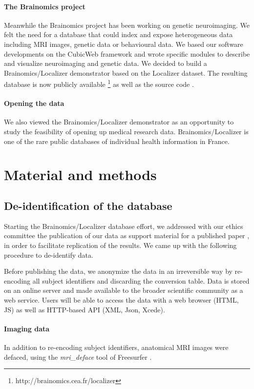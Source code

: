 \documentclass[review]{elsarticle}
\begin{document}
\paragraph{The Brainomics project} Meanwhile the Brainomics project has been working on genetic neuroimaging. We felt the need for a database that could index and expose heterogeneous data including MRI images, genetic data or behavioural data. We based our software developments on the CubicWeb framework and wrote specific modules to describe and visualize neuroimaging and genetic data. We decided to build a Brainomics/Localizer demonstrator based on the Localizer dataset. The resulting database is now publicly available \footnote{http://brainomics.cea.fr/localizer} as well as the source code \cite{Localizer}.

\paragraph{Opening the data} We also viewed the Brainomics/Localizer demonstrator as an opportunity to study the feasibility of opening up medical research data. Brainomics/Localizer is one of the rare public databases of individual health information in France.


\section{Material and methods}

\subsection{De-identification of the database}

Starting the Brainomics/Localizer database effort, we addressed with our ethics committee the publication of our data as support material for a published paper \cite{Pinel2012}, in order to facilitate replication of the results. We came up with the following procedure to de-identify data.

Before publishing the data, we anonymize the data in an irreversible way by re-encoding all subject identifiers and discarding the conversion table. Data is stored on an online server and made available to the broader scientific community as a web service. Users will be able to access the data with a web browser (HTML, JS) as well as HTTP-based API (XML, Json, Xcede).

\paragraph{Imaging data} In addition to re-encoding subject identifiers, anatomical MRI images were defaced, using the \textit{mri\_deface} tool of Freesurfer \cite{Fischl2012}.
\end{document}
